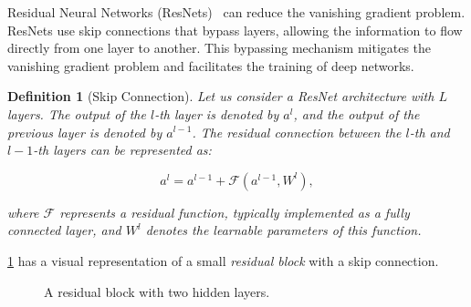 \documentclass[ppgc,diss,english]{iiufrgs}
\newtheorem{definition}{Definition}
\begin{document}
Residual Neural Networks (ResNets)~\cite{He.etal/2016} can reduce the vanishing gradient problem. ResNets use skip connections that bypass layers, allowing the information to flow directly from one layer to another. This bypassing mechanism mitigates the vanishing gradient problem and facilitates the training of deep networks.

\begin{definition}[Skip Connection]
Let us consider a ResNet architecture with $L$ layers. The output of the $l$-th layer is denoted by $a^{l}$, and the output of the previous layer is denoted by $a^{l-1}$. The residual connection between the $l$-th and $l-1$-th layers can be represented as:

$$a^{l} = a^{l-1} + \mathcal{F}(a^{l-1}, W^{l}),$$

where $\mathcal{F}$ represents a residual function, typically implemented as a fully connected layer, and $W^{l}$ denotes the learnable parameters of this function.
\end{definition}

\cref{fig:residual-block} has a visual representation of a small \emph{residual block} with a skip connection.

\begin{figure}[tb]
\caption[A residual block]{A residual block with two hidden layers.}
\centering
{}
\label{fig:residual-block}
\end{figure}
\end{document}
